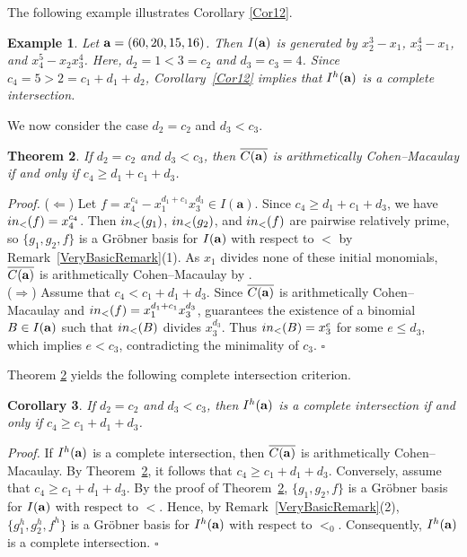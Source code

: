 \documentclass[10pt,a4paper]{amsart}
\newtheorem{thm1}{Theorem}[section]
\newtheorem{cor1}[thm1]{Corollary}
\newtheorem{ex1}[thm1]{Example}
\begin{document}
The following example illustrates Corollary \ref{Cor12}.

\begin{ex1} {\rm Let ${\bf a}=(60, 20, 15, 16)$. Then $I({\bf a})$ is generated by $x_{2}^3-x_1$, $x_{3}^{4}-x_{1}$, and $x_{4}^{5}-x_{2}x_{3}^4$. Here, $d_2=1<3=c_2$ and $d_3=c_3=4$. Since $c_4=5>2=c_1+d_1+d_2$, Corollary~\ref{Cor12} implies that
$I^{h}({\bf a})$ is a complete intersection.}
\end{ex1}

We now consider the case $d_2=c_2$ and $d_3<c_3$.

\begin{thm1} \label{ACM6} If $d_2=c_{2}$ and $d_{3}<c_3$, then $\overline{C({\bf a})}$ is arithmetically Cohen--Macaulay if and only if $c_{4} \geq d_1+c_1+d_{3}$.
\end{thm1}

{\em \noindent Proof.} ($\Leftarrow$) Let $f=x_{4}^{c_4}-x_{1}^{d_1+c_1}x_{3}^{d_3}\in I(\mathbf a)$. Since $c_{4} \geq d_1+c_1+d_{3}$, we have ${\rm in}_{<}(f)=x_{4}^{c_4}$.
Then ${\rm in}_{<}(g_1)$, ${\rm in}_{<}(g_2)$, and ${\rm in}_{<}(f)$ are pairwise relatively prime, so $\{g_1, g_2, f\}$ is a Gr\"obner basis for $I({\bf a})$ with respect to $<$ by Remark~\ref{VeryBasicRemark}(1). As $x_1$ divides none of these initial monomials, $\overline{C({\bf a})}$ is arithmetically Cohen--Macaulay by \cite[Theorem 2.2]{HerSta}.\\
($\Rightarrow$) Assume that $c_{4}<c_1+d_{1}+d_{3}$. Since $\overline{C({\bf a})}$ is arithmetically Cohen--Macaulay and ${\rm in}_{<}(f)=x_{1}^{d_1+c_1}x_{3}^{d_3}$, \cite[Theorem 2.2]{HerSta} guarantees the existence of a binomial $B \in I({\bf a})$ such that ${\rm in}_{<}(B)$ divides $x_{3}^{d_3}$. Thus ${\rm in}_{<}(B)=x_{3}^{e}$ for some $e \leq d_3$, which implies $e<c_3$, contradicting the minimality of $c_3$. \hfill $\square$ \par\vspace{0.5\baselineskip}

Theorem \ref{ACM6} yields the following complete intersection criterion.

\begin{cor1} \label{Cor13} If $d_2=c_{2}$ and $d_{3}<c_3$, then $I^{h}({\bf a})$ is a complete intersection if and only if $c_{4} \geq c_1+d_{1}+d_{3}$.
\end{cor1}

{\em \noindent Proof.} If $I^{h}({\bf a})$ is a complete intersection, then $\overline{C({\bf a})}$ is arithmetically Cohen--Macaulay. By Theorem~\ref{ACM6}, it follows that $c_4 \ge c_1+d_1+d_3$. Conversely, assume that $c_{4} \geq c_1+d_{1}+d_{3}$. By the proof of Theorem~\ref{ACM6}, $\{g_1,g_2,f\}$ is a Gr\"obner basis for $I({\bf a})$ with respect to $<$. Hence, by Remark~\ref{VeryBasicRemark}(2), $\{g_1^{h},g_2^{h},f^{h}\}$ is a Gr\"obner basis for $I^{h}({\bf a})$ with respect to $<_0$. Consequently, $I^{h}({\bf a})$ is a complete intersection. \hfill $\square$ \par\vspace{0.5\baselineskip}
\end{document}
